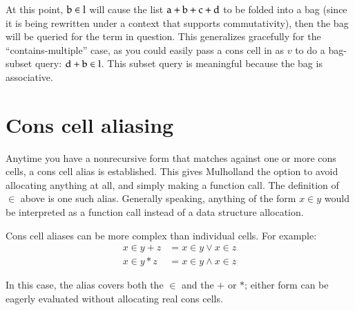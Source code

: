 \documentclass{report}
\begin{document}
    At this point, $\textrm b \in \textrm l$ will cause the list $\textrm a + \textrm b + \textrm c + \textrm d$ to be folded into a bag (since it is being rewritten under a
    context that supports commutativity), then the bag will be queried for the term in question. This generalizes gracefully for the ``contains-multiple'' case, as you could easily pass a cons
    cell in as $v$ to do a bag-subset query: $\textrm d + \textrm b \in \textrm l$. This subset query is meaningful because the bag is associative.

\section{Cons cell aliasing}
    Anytime you have a nonrecursive form that matches against one or more cons cells, a cons cell alias is established. This gives Mulholland the option to avoid allocating anything at all,
    and simply making a function call. The definition of $\in$ above is one such alias. Generally speaking, anything of the form $x \in y$ would be interpreted as a function call instead of a
    data structure allocation.

    Cons cell aliases can be more complex than individual cells. For example:
\begin{align*}
x \in y + z & = x \in y \vee x \in z \\
x \in y * z & = x \in y \wedge x \in z
\end{align*}

    In this case, the alias covers both the $\in$ and the $+$ or $*$; either form can be eagerly evaluated without allocating real cons cells.
\end{document}
